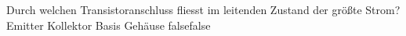     {Durch welchen Transistoranschluss fliesst im leitenden Zustand der größte Strom?}
    {Emitter}
    {Kollektor}
    {Basis}
    {Gehäuse}
    {false}{false}